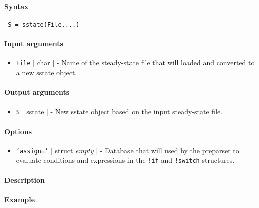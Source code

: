 


	\paragraph{Syntax}
 
 \begin{verbatim}
 S = sstate(File,...)
 \end{verbatim}
 
 \paragraph{Input arguments}
 
 \begin{itemize}
 \item
   \texttt{File} {[} char {]} - Name of the steady-state file that will
   loaded and converted to a new sstate object.
 \end{itemize}
 
 \paragraph{Output arguments}
 
 \begin{itemize}
 \item
   \texttt{S} {[} sstate {]} - New sstate object based on the input
   steady-state file.
 \end{itemize}
 
 \paragraph{Options}
 
 \begin{itemize}
 \item
   \texttt{'assign='} {[} struct \textbar{} \emph{empty} {]} - Database
   that will used by the preparser to evaluate conditions and expressions
   in the \texttt{!if} and \texttt{!switch} structures.
 \end{itemize}
 
 \paragraph{Description}
 
 \paragraph{Example}


